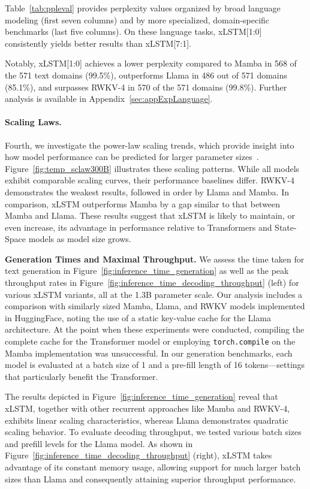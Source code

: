 Table~\ref{tab:ppleval} provides perplexity values organized by broad language modeling (first seven columns) and by more specialized, domain-specific benchmarks (last five columns). On these language tasks, xLSTM[1:0] consistently yields better results than xLSTM[7:1]. 

Notably, xLSTM[1:0] achieves a lower perplexity compared to Mamba in 568 of the 571 text domains (99.5\%), outperforms Llama in 486 out of 571 domains (85.1\%), and surpasses RWKV-4 in 570 of the 571 domains (99.8\%). Further analysis is available in Appendix~\ref{sec:appExpLanguage}.

\paragraph{Scaling Laws.} Fourth, we investigate the power-law scaling trends, which provide insight into how model performance can be predicted for larger parameter sizes~\citep{Kaplan:20,Brown:20short}. Figure~\ref{fig:temp_sclaw300B} illustrates these scaling patterns. While all models exhibit comparable scaling curves, their performance baselines differ. RWKV-4 demonstrates the weakest results, followed in order by Llama and Mamba. In comparison, xLSTM outperforms Mamba by a gap similar to that between Mamba and Llama. These results suggest that xLSTM is likely to maintain, or even increase, its advantage in performance relative to Transformers and State-Space models as model size grows.

\textbf{Generation Times and Maximal Throughput.} We assess the time taken for text generation in Figure~\ref{fig:inference_time_generation} as well as the peak throughput rates in Figure~\ref{fig:inference_time_decoding_throughput} (left) for various xLSTM variants, all at the 1.3B parameter scale. Our analysis includes a comparison with similarly sized Mamba, Llama, and RWKV models implemented in HuggingFace, noting the use of a static key-value cache for the Llama architecture. At the point when these experiments were conducted, compiling the complete cache for the Transformer model or employing \texttt{torch.compile} on the Mamba implementation was unsuccessful. In our generation benchmarks, each model is evaluated at a batch size of 1 and a pre-fill length of 16 tokens—settings that particularly benefit the Transformer. 

The results depicted in Figure~\ref{fig:inference_time_generation} reveal that xLSTM, together with other recurrent approaches like Mamba and RWKV-4, exhibits linear scaling characteristics, whereas Llama demonstrates quadratic scaling behavior. To evaluate decoding throughput, we tested various batch sizes and prefill levels for the Llama model. As shown in Figure~\ref{fig:inference_time_decoding_throughput} (right), xLSTM takes advantage of its constant memory usage, allowing support for much larger batch sizes than Llama and consequently attaining superior throughput performance.


